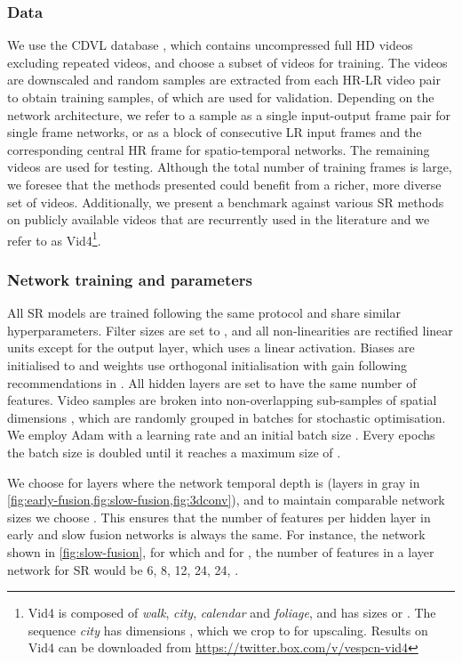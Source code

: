 \documentclass[10pt,twocolumn,letterpaper]{article}
\begin{document}
\subsubsection{Data}

We use the CDVL database \cite{cdvl}, which contains  uncompressed full \gls{HD} videos excluding repeated videos, and choose a subset of  videos for training. The videos are downscaled and  random samples are extracted from each \gls{HR}-\gls{LR} video pair to obtain  training samples,  of which are used for validation. Depending on the network architecture, we refer to a sample as a single input-output frame pair for single frame networks, or as a block of consecutive \gls{LR} input frames and the corresponding central \gls{HR} frame for spatio-temporal networks. The remaining  videos are used for testing. Although the total number of training frames is large, we foresee that the methods presented could benefit from a richer, more diverse set of videos. Additionally, we present a benchmark against various \gls{SR} methods on publicly available videos that are recurrently used in the literature and we refer to as Vid4\footnote{Vid4 is composed of \textit{walk}, \textit{city}, \textit{calendar} and \textit{foliage}, and has sizes  or . The sequence \textit{city} has dimensions , which we crop to  for  upscaling. Results on Vid4 can be downloaded from \url{https://twitter.box.com/v/vespcn-vid4}}.

\subsubsection{Network training and parameters}

All \gls{SR} models are trained following the same protocol and share similar hyperparameters. Filter sizes are set to  , and all non-linearities  are rectified linear units except for the output layer, which uses a linear activation. Biases are initialised to  and weights use orthogonal initialisation with gain  following recommendations in \cite{Saxe2013}. All hidden layers are set to have the same number of features. Video samples are broken into non-overlapping sub-samples of spatial dimensions , which are randomly grouped in batches for stochastic optimisation. We employ Adam \cite{Kingma2014} with a learning rate  and an initial batch size . Every  epochs the batch size is doubled until it reaches a maximum size of .

We choose  for layers where the network temporal depth is  (layers in gray in \cref{fig:early-fusion,fig:slow-fusion,fig:3dconv}), and to maintain comparable network sizes we choose . This ensures that the number of features per hidden layer in early and slow fusion networks is always the same. For instance, the network shown in \cref{fig:slow-fusion}, for which  and  for , the number of features in a  layer network for  \gls{SR} would be 6, 8, 12, 24, 24, .
\end{document}
